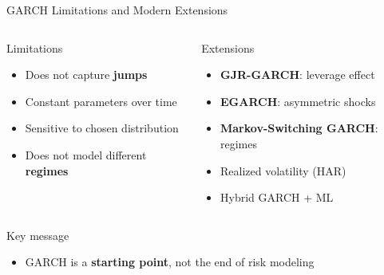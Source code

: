 \documentclass[9pt, aspectratio=169, t]{beamer}
\begin{document}
\begin{frame}{GARCH Limitations and Modern Extensions}
    \begin{columns}[T]
        \begin{alertblock}{Limitations}
            \begin{itemize}\setlength{\itemsep}{0pt}
                \item Does not capture \textbf{jumps}
                \item Constant parameters over time
                \item Sensitive to chosen distribution
                \item Does not model different \textbf{regimes}
            \end{itemize}
        \end{alertblock}

        \begin{exampleblock}{Extensions}
            \begin{itemize}\setlength{\itemsep}{0pt}
                \item \textbf{GJR-GARCH}: leverage effect
                \item \textbf{EGARCH}: asymmetric shocks
                \item \textbf{Markov-Switching GARCH}: regimes
                \item Realized volatility (HAR)
                \item Hybrid GARCH + ML
            \end{itemize}
        \end{exampleblock}
    \end{columns}

    \vspace{0.3cm}

    \begin{block}{Key message}
        \begin{itemize}\setlength{\itemsep}{0pt}
            \item GARCH is a \textbf{starting point}, not the end of risk modeling
        \end{itemize}
    \end{block}
\end{frame}
\end{document}
